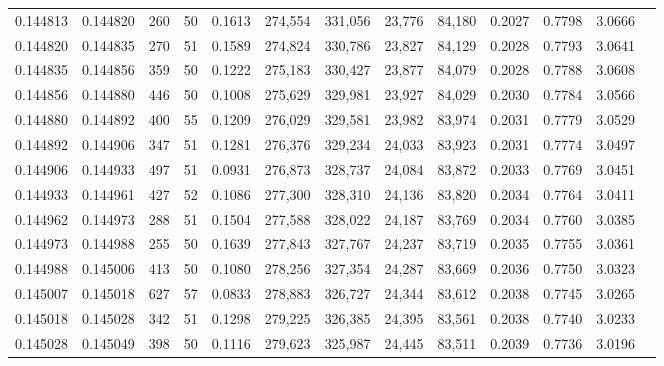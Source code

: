 \begin{tabular}{rrrrrrrrrrrrr}
0.144813 & 0.144820 &   260 &  50 &                                     0.1613 & 274,554 & 331,056 &  23,776 &  84,180 & 0.2027 & 0.7798 & 3.0666 \\
0.144820 & 0.144835 &   270 &  51 &                                     0.1589 & 274,824 & 330,786 &  23,827 &  84,129 & 0.2028 & 0.7793 & 3.0641 \\
0.144835 & 0.144856 &   359 &  50 &                                     0.1222 & 275,183 & 330,427 &  23,877 &  84,079 & 0.2028 & 0.7788 & 3.0608 \\
0.144856 & 0.144880 &   446 &  50 &                                     0.1008 & 275,629 & 329,981 &  23,927 &  84,029 & 0.2030 & 0.7784 & 3.0566 \\
0.144880 & 0.144892 &   400 &  55 &                                     0.1209 & 276,029 & 329,581 &  23,982 &  83,974 & 0.2031 & 0.7779 & 3.0529 \\
0.144892 & 0.144906 &   347 &  51 &                                     0.1281 & 276,376 & 329,234 &  24,033 &  83,923 & 0.2031 & 0.7774 & 3.0497 \\
0.144906 & 0.144933 &   497 &  51 &                                     0.0931 & 276,873 & 328,737 &  24,084 &  83,872 & 0.2033 & 0.7769 & 3.0451 \\
0.144933 & 0.144961 &   427 &  52 &                                     0.1086 & 277,300 & 328,310 &  24,136 &  83,820 & 0.2034 & 0.7764 & 3.0411 \\
0.144962 & 0.144973 &   288 &  51 &                                     0.1504 & 277,588 & 328,022 &  24,187 &  83,769 & 0.2034 & 0.7760 & 3.0385 \\
0.144973 & 0.144988 &   255 &  50 &                                     0.1639 & 277,843 & 327,767 &  24,237 &  83,719 & 0.2035 & 0.7755 & 3.0361 \\
0.144988 & 0.145006 &   413 &  50 &                                     0.1080 & 278,256 & 327,354 &  24,287 &  83,669 & 0.2036 & 0.7750 & 3.0323 \\
0.145007 & 0.145018 &   627 &  57 &                                     0.0833 & 278,883 & 326,727 &  24,344 &  83,612 & 0.2038 & 0.7745 & 3.0265 \\
0.145018 & 0.145028 &   342 &  51 &                                     0.1298 & 279,225 & 326,385 &  24,395 &  83,561 & 0.2038 & 0.7740 & 3.0233 \\
0.145028 & 0.145049 &   398 &  50 &                                     0.1116 & 279,623 & 325,987 &  24,445 &  83,511 & 0.2039 & 0.7736 & 3.0196 \\

\end{tabular}
